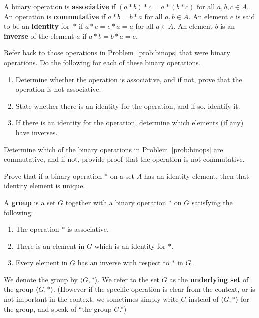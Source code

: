 \begin{definition}
A binary operation is \textbf{associative} if \((a * b)*c = a*(b*c)\) for all \(a,b,c \in A\). An operation is \textbf{commutative} if \(a * b = b * a\) for all \(a,b \in A\). An element \(e\) is said to be an \textbf{identity} for~\(*\) if \(a*e = e*a = a\) for all \(a \in A\).
An element \(b\) is an \textbf{inverse} of the element \(a\) if \(a * b = b * a = e\).
\end{definition}

\begin{problem}
Refer back to those operations in Problem~\ref{prob:binops} that were binary operations.
Do the following for each of these binary operations.
\begin{enumerate}
  \item Determine whether the operation is associative, and if not, prove that the operation is not associative.
  \item State whether there is an identity for the operation, and if so, identify it.
  \item If there is an identity for the operation, determine which elements (if any) have inverses.
\end{enumerate}
\end{problem}

\begin{problem}
Determine which of the binary operations in Problem~\ref{prob:binops} are commutative, and if not, provide proof that the operation is not commutative.
\end{problem}

\begin{problem}
Prove that if a binary operation \(*\) on a set \(A\) has an identity element, then that identity element is unique.
\end{problem}

\begin{definition}
A \textbf{group} is a set \(G\) together with a binary operation \(*\) on \(G\) satisfying the following:
\begin{enumerate}
  \item The operation \(*\) is associative.
  \item There is an element in \(G\) which is an identity for \(*\).
  \item Every element in \(G\) has an inverse with respect to \(*\) in \(G\).
\end{enumerate}
We denote the group by \(\langle G, * \rangle\). We refer to the set \(G\) as the \textbf{underlying set} of the group \(\langle G, * \rangle\). (However if the specific operation is clear from the context, or is not important in the context, we sometimes simply write \(G\) instead of \(\langle G, * \rangle\) for the group, and speak of ``the group \(G\).'')
\end{definition}

